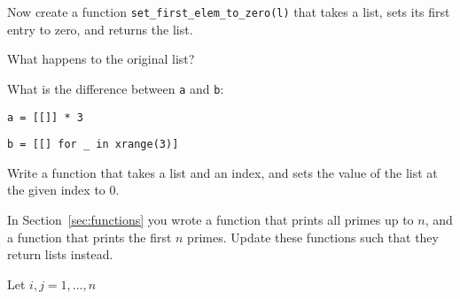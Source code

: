 \begin{questions}

Now create a function \verb|set_first_elem_to_zero(l)| that takes a list, sets its
first entry to zero, and returns the list.

What happens to the original list?


What is the difference between \texttt{a} and \texttt{b}:

\verb|a = [[]] * 3|

\verb|b = [[] for _ in xrange(3)]|


\label{sub:lists_and_functions}

Write a function that takes a list and an index, and sets the value of the list
at the given index to 0.


\label{sub:primes}

In Section~\ref{sec:functions} you wrote a function that prints all primes up to $n$, and
a function that prints the first $n$ primes.
Update these functions such that they return lists instead.


\label{sub:list_comprehensions}

Let $i, j = 1,\ldots, n$

\end{questions}
